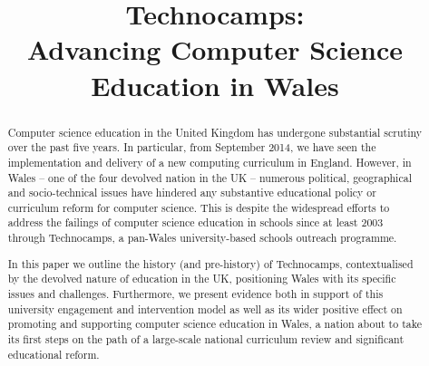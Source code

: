 \documentclass{sig-alternate}
\begin{document}
%

\title{Technocamps:\\[1ex] Advancing Computer Science Education in Wales}


\maketitle

\begin{abstract}
Computer science education in the United Kingdom has
undergone substantial scrutiny over the past five years.
In particular, from September 2014, we have seen
the implementation and delivery
of a new computing curriculum in England.
However, in Wales --
one of the four devolved nation in the UK -- numerous political,
geographical and socio-technical issues have hindered any substantive
educational policy or curriculum reform for computer science.
This is despite the widespread efforts to address the failings of
computer science education in schools since at least 2003 through
Technocamps, a pan-Wales university-based schools outreach
programme.

In this paper we outline the history (and pre-history) of
Technocamps, contextualised by the devolved nature of education in the
UK, positioning Wales with its specific issues and
challenges. Furthermore, we present evidence both in support of this
university engagement and intervention model as well as its wider
positive effect on promoting and supporting computer science education
in Wales, a nation about to take its first steps on the path of a
large-scale national curriculum review and significant educational
reform.
\end{abstract}
\end{document}
